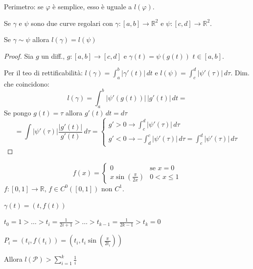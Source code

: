 Perimetro: se $\varphi$ è semplice, esso è uguale a $l(\varphi)$.

\begin{prop}
Se $\gamma$ e $\psi$ sono due curve regolari con $\gamma : [a, b] \to \mathbb{R}^2$ e $\psi : [c, d] \to \mathbb{R}^2$.

Se $\gamma \sim \psi$ allora $l(\gamma) = l(\psi)$
\end{prop}

\begin{proof}
Sia $g$ un diff., $g : [a, b] \to [c, d]$ e $\gamma(t) = \psi(g(t))$ $t \in [a, b]$.

Per il teo di rettificabilità: $l(\gamma) = \int_a^b \vert \gamma'(t) \vert \, dt$ e $l(\psi) = \int_c^d \vert \psi'(\tau) \vert \, d\tau$. Dim. che coincidono:
\[
l(\gamma) = \int_a^b \vert \psi'(g(t)) \vert \, \vert g'(t) \vert \, dt =
\]
Se pongo $g(t) = \tau$ allora $g'(t) \, dt = d\tau$
\[
= \int \vert \psi'(\tau) \vert \frac{\vert g'(t) \vert}{g'(t)} \, d\tau = \begin{cases}
g' > 0 \to \int_c^d \vert \psi'(\tau) \vert \, d\tau \\
g' < 0 \to -\int_d^c \vert \psi'(\tau) \vert \, d\tau = \int_c^d \vert \psi'(\tau) \vert \, d\tau
\end{cases}
\]
\end{proof}

\begin{example}
\[
f(x) = \begin{cases}
0 & \text{se } x = 0 \\
x \sin\left(\frac{\pi}{2x}\right) & 0 < x \le 1
\end{cases}
\]
$f : [0, 1] \to \mathbb{R}$, $f \in C^0([0, 1])$ non $C^1$.

$\gamma(t) = (t, f(t))$

$t_0 = 1 > \dots > t_i = \frac{1}{2i+1} > \dots > t_{k-1} = \frac{1}{2k-1} > t_k = 0$ 

$P_i = (t_i, f(t_i)) = \left(t_i, t_i \sin\left(\frac{\pi}{2t_i}\right)\right)$

Allora $l(\mathcal{P}) > \sum_{i=1}^{k} \frac{1}{i}$

\begin{center}
\end{center}
\end{example}

